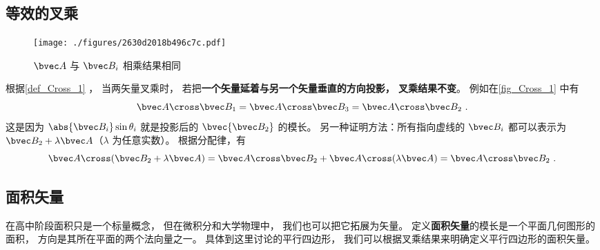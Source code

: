 
\subsection{等效的叉乘}\label{sub_Cross_1}
\begin{figure}[ht]
\centering
\texttt{[image: ./figures/2630d2018b496c7c.pdf]}
\caption{$\bvec A$ 与 $\bvec B_i$ 相乘结果相同} \label{fig_Cross_1}
\end{figure}

根据\autoref{def_Cross_1} ， 当两矢量叉乘时， 若把\textbf{一个矢量延着与另一个矢量垂直的方向投影， 叉乘结果不变}。 例如在\autoref{fig_Cross_1} 中有
\begin{equation}
\bvec A\cross\bvec B_1 = \bvec A \cross \bvec B_3 = \bvec A\cross \bvec B_2~.
\end{equation}
这是因为 $\abs{\bvec B_i}\sin\theta_i$ 就是投影后的 $\bvec{\bvec B_2}$ 的模长。 另一种证明方法：所有指向虚线的 $\bvec B_i$ 都可以表示为 $\bvec B_2 + \lambda \bvec A$（$\lambda$ 为任意实数）。 根据分配律，有
\begin{equation}
\bvec A \cross (\bvec B_2 + \lambda \bvec A) = \bvec A \cross \bvec B_2 + \bvec A \cross (\lambda \bvec A) = \bvec A \cross \bvec B_2~.
\end{equation}

\subsection{面积矢量}
在高中阶段面积只是一个标量概念， 但在微积分和大学物理中， 我们也可以把它拓展为矢量。 定义\textbf{面积矢量}的模长是一个平面几何图形的面积， 方向是其所在平面的两个法向量之一。 具体到这里讨论的平行四边形， 我们可以根据叉乘结果来明确定义平行四边形的面积矢量。

